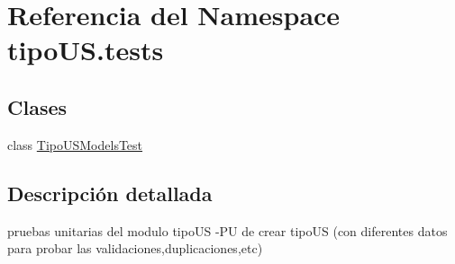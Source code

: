 \hypertarget{namespacetipo_u_s_1_1tests}{}\section{Referencia del Namespace tipo\+U\+S.\+tests}
\label{namespacetipo_u_s_1_1tests}
\subsection*{Clases}
\begin{DoxyCompactItemize}
\item 
class \hyperlink{classtipo_u_s_1_1tests_1_1_tipo_u_s_models_test}{Tipo\+U\+S\+Models\+Test}
\end{DoxyCompactItemize}


\subsection{Descripción detallada}
\begin{DoxyVerb}pruebas unitarias del modulo tipoUS
    -PU de crear tipoUS (con diferentes datos para probar las validaciones,duplicaciones,etc)\end{DoxyVerb}
 